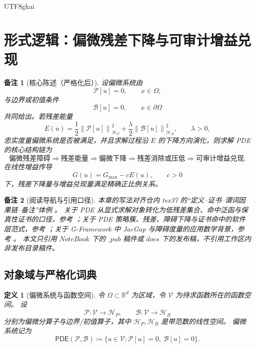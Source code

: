 \documentclass[12pt]{article}
\newtheorem{definition}{定义}[section]
\newtheorem{remark}{备注}[section]
\newcommand{\RR}{\mathbb{R}}
\newcommand{\GFramework}{\textsf{G-Framework}}
\newcommand{\DefEq}{\coloneqq}
\newcommand{\Pcal}{\mathcal P}
\newcommand{\Bcal}{\mathcal B}
\newcommand{\Vcal}{\mathcal V}
\newcommand{\Hcal}{\mathcal H}
\newcommand{\norm}[1]{\left\lVert #1 \right\rVert}
\begin{document}
\begin{CJK*}{UTF8}{gkai}
\setcounter{tocdepth}{3}
\setcounter{secnumdepth}{3}
\tableofcontents
\clearpage

\section{形式逻辑：偏微残差下降与可审计增益兑现}
\label{sec:tex58-pde-residual-descent-gain}

\begin{remark}[核心陈述（严格化后）]
设偏微系统由
\[
  \Pcal[u]=0,\qquad x\in\Omega,
\]
与边界或初值条件
\[
  \Bcal[u]=0,\qquad x\in\partial\Omega
\]
共同给出。若残差能量
\[
  E(u)
  =
  \frac12\norm{\Pcal[u]}_{\Hcal_P}^{2}
  +
  \frac{\lambda}{2}\norm{\Bcal[u]}_{\Hcal_B}^{2},
  \qquad \lambda>0,
\]
忠实度量偏微系统是否被满足，并且求解过程沿 \(E\) 的下降方向演化，则求解 PDE 的核心结构链为
\[
  \text{偏微残差障碍}
  \Longrightarrow
  \text{残差能量}
  \Longrightarrow
  \text{偏微下降}
  \Longrightarrow
  \text{残差消除或压低}
  \Longrightarrow
  \text{可审计增益兑现}.
\]
在线性增益传导
\[
  G(u)=G_{\max}-cE(u),\qquad c>0
\]
下，残差下降量与增益兑现量满足精确正比例关系。
\end{remark}

\begin{remark}[阅读导航与引用口径]
本章的写法对齐仓内 tex37 的“定义--证书--谓词因果链--备注”体例
\cite{RepoTex37SemanticGauge}。
关于 PDE 从显式求解对象转化为低残差集合、命中泛函与保真性证书的口径，参考
\cite{RepoTex55PDEParadigm}；关于 PDE 策略簇、残差、障碍下降与证书命中的软件层范式，参考
\cite{RepoTex53StrategyCluster}；关于 \GFramework{} 中 JacGap 与障碍度量的应用数学背景，参考
\cite{RepoAppMathVol1}。
本文只引用 \(NoteBook\) 下的 \(\_pub\) 稿件或 \(docs\) 下的发布稿，不引用工作区内非发布目录稿件。
\end{remark}

\subsection{对象域与严格化词典}
\label{subsec:tex58-objects}

\begin{definition}[偏微系统与函数空间]
\label{def:tex58-pde-system}
令 \(\Omega\subset\RR^d\) 为区域，令 \(\Vcal\) 为待求函数所在的函数空间。
设
\[
  \Pcal:\Vcal\to\Hcal_P,
  \qquad
  \Bcal:\Vcal\to\Hcal_B
\]
分别为偏微分算子与边界/初值算子，其中 \(\Hcal_P,\Hcal_B\) 是带范数的线性空间。
偏微系统记为
\[
  \mathsf{PDE}(\Pcal,\Bcal)
  \DefEq
  \{u\in\Vcal:\Pcal[u]=0,\ \Bcal[u]=0\}.
\]
\end{definition}


\end{CJK*}
\end{document}
